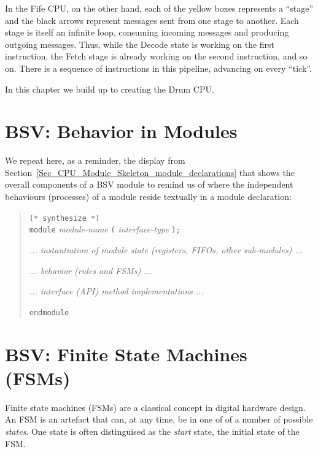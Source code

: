 In the Fife CPU, on the other hand, each of the yellow boxes
represents a ``stage'' and the black arrows represent messages sent
from one stage to another.  Each stage is itself an infinite loop,
consuming incoming messages and producing outgoing messages.  Thus,
while the Decode state is working on the first instruction, the Fetch
stage is already working on the second instruction, and so on.  There
is a sequence of instructions in this pipeline, advancing on every
``tick''.

In this chapter we build up to creating the Drum CPU.


\section{BSV: Behavior in Modules}

\label{Sec_FSMs_Behavior}


We repeat here, as a reminder, the display from
Section~\ref{Sec_CPU_Module_Skeleton_module_declarations} that shows
the overall components of a BSV module to remind us of where the
independent behaviours (processes) of a module reside textually in a
module declaration:

\begin{quote}
{\tt (* synthesize *)} \\
{\tt module} \emph{module-name} {\tt (} \emph{interface-type} {\tt );}

\hmm \emph{... instantiation of module state (registers, FIFOs, other sub-modules) ...}

\hmm \emph{... behavior (rules and FSMs) ...}

\hmm \emph{... interface (API) method implementations ...}

{\tt endmodule}
\end{quote}


\section{BSV: Finite State Machines (FSMs)}

\label{Sec_FSMs_FSMs}


Finite state machines (FSMs) are a classical concept in digital
hardware design.  An FSM is an artefact that can, at any time, be in
one of of a number of possible \emph{states}.  One state is often
distinguised as the \emph{start} state, the initial state of the FSM.

